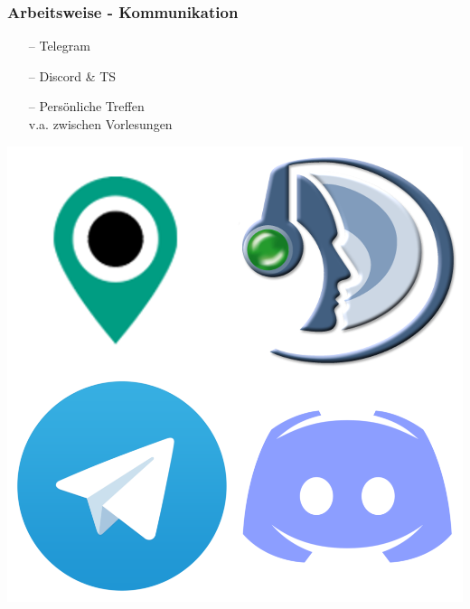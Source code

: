 \documentclass[aspectratio=1610]{beamer}
\begin{document}
  \begin{frame}[plain]
      \frametitle{\textbf{Arbeitsweise} - Kommunikation}
      \begin{minipage}{0.45\textwidth}
        \begin{itemize}
          \item[--] Telegram
          \item[--] Discord \& TS
          \item[--] Persönliche Treffen \\ v.a. zwischen Vorlesungen
        \end{itemize}
      \end{minipage}
      \begin{minipage}{0.45\textwidth}
        \includegraphics[width = \columnwidth - 30pt]
          {images/meet-im-voip.png}
      \end{minipage}
  \end{frame}

\end{document}
